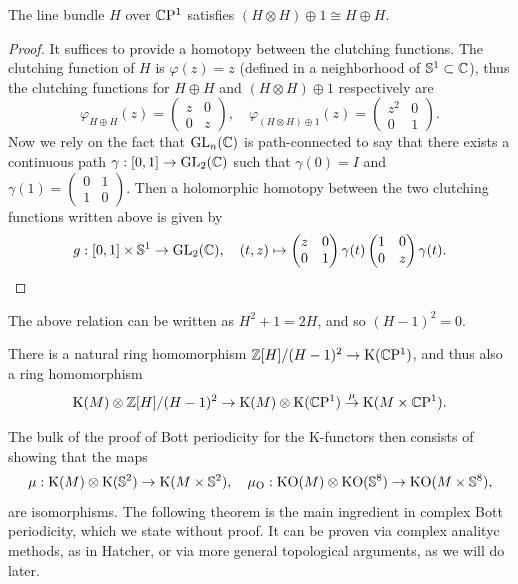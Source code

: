 \begin{prop}
    The line bundle $H$ over $\mathbb{C}\mathrm{P}^1$ satisfies $(H\otimes H)\oplus 1\cong H\oplus H$.
\end{prop}
\begin{proof}
    It suffices to provide a homotopy between the clutching functions. The clutching function of $H$ is $\varphi(z)=z$ (defined in a neighborhood of $\mathbb{S}^1\subset \mathbb{C}$), thus the clutching functions for $H\oplus H$  and $(H\otimes H)\oplus 1$ respectively are
    \[\varphi_{H\oplus H}(z)=\begin{pmatrix}
        z&0\\0&z
    \end{pmatrix},\quad \varphi_{(H\otimes H)\oplus 1}(z)=\begin{pmatrix}
        z^2&0\\0&1
    \end{pmatrix}.\]
    Now we rely on the fact that $\operatorname{GL}_n(\mathbb{C})$ is path-connected to say that there exists a continuous path $\gamma:[0,1]\to \operatorname{GL}_2(\mathbb{C})$ such that $\gamma(0)=I$ and $\gamma(1)=\begin{pmatrix}
        0&1\\1&0
    \end{pmatrix}.$
    Then a holomorphic homotopy between the two clutching functions written above is given by
    \[g:[0,1]\times\mathbb{S}^1\to \operatorname{GL}_2(\mathbb{C}),\quad (t,z)\mapsto \begin{pmatrix}
        z&0\\0&1
    \end{pmatrix}\gamma(t)
    \begin{pmatrix}
        1&0\\0&z
    \end{pmatrix}\gamma(t).\]
\end{proof}
The above relation can be written as $H^2+1=2H$, and so $(H-1)^2=0$.
\begin{cor}
    There is a natural ring homomorphism $\mathbb{Z}[H]\slash (H-1)^2\to \mathrm{K}(\mathbb{C}\mathrm{P}^1)$, and thus also a ring homomorphism
    \[\mathrm{K}(M)\otimes \mathbb{Z}[H]\slash (H-1)^2\to \mathrm{K}(M)\otimes \mathrm{K}(\mathbb{C}\mathrm{P}^1)\overset{\mu}{\to}\mathrm{K}(M\times \mathbb{C}\mathrm{P}^1).\]
\end{cor}

The bulk of the proof of Bott periodicity for the K-functors then consists of showing that the maps 
\[\mu:\mathrm{K}(M)\otimes \mathrm{K}(\mathbb{S}^2)\to \mathrm{K}(M\times \mathbb{S}^2),\quad \mu_{\operatorname{O}}:\mathrm{KO}(M)\otimes \mathrm{KO}(\mathbb{S}^8)\to \mathrm{KO}(M\times\mathbb{S}^8),\]
are isomorphisms. The following theorem is the main ingredient in complex Bott periodicity, which we state without proof. It can be proven via complex analityc methods, as in Hatcher, or via more general topological arguments, as we will do later.


